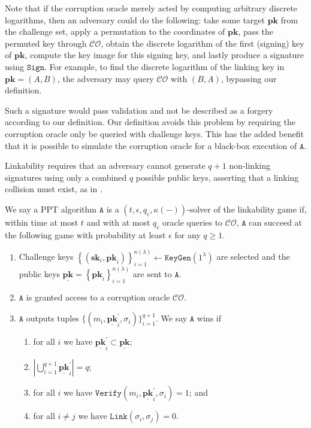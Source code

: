 \documentclass[draft]{llncs} %
\begin{document}
\begin{remark}
Note that if the corruption oracle merely acted by computing arbitrary discrete logarithms, then an adversary could do the following: take some target $\textbf{pk}$ from the challenge set, apply a permutation to the coordinates of $\textbf{pk}$, pass the permuted key through $\mathcal{CO}$, obtain the discrete logarithm of the first (signing) key of $\textbf{pk}$, compute the key image for this signing key, and lastly produce a signature using $\texttt{Sign}$. For example, to find the discrete logarithm of the linking key in $\textbf{pk} = (A, B)$, the adversary may query $\mathcal{CO}$ with $(B, A)$, bypassing our definition.

Such a signature would pass validation and not be described as a forgery according to our definition. Our definition avoids this problem by requiring the corruption oracle only be queried with challenge keys. This has the added benefit that it is possible to simulate the corruption oracle for a black-box execution of $\texttt{A}$.
\end{remark}

Linkability requires that an adversary cannot generate $q + 1$ non-linking signatures using only a combined $q$ possible public keys, asserting that a linking collision must exist, as in \cite{backes2019ring}.

\begin{definition}[Linkability]
We say a PPT algorithm $\texttt{A}$  is a $(t, \epsilon, q_c, \kappa(-))$-solver of the linkability game if, within time at most $t$ and with at most $q_c$ oracle queries to $\mathcal{CO}$, $\texttt{A}$ can succeed at the following game with probability at least $\epsilon$ for any $q \geq 1$.
\begin{enumerate}
\item Challenge keys $\left\{(\textbf{sk}_i, \textbf{pk}_i)\right\}_{i=1}^{\kappa(\lambda)} \leftarrow \texttt{KeyGen}(1^\lambda)$ are selected and the public keys $\underline{\textbf{pk}} = \left\{\textbf{pk}_i\right\}_{i=1}^{n(\lambda)}$ are sent to $\texttt{A}$.

\item $\texttt{A}$ is granted access to a corruption oracle $\mathcal{CO}$.

\item $\texttt{A}$ outputs tuples $\{(m_i, \underline{\textbf{pk}}_i^\prime, \sigma_i)\}_{i=1}^{q+1}$. We say $\texttt{A}$ wins if
\begin{enumerate}
\item for all $i$ we have $\underline{\textbf{pk}}_i^\prime \subset \underline{\textbf{pk}}$;
\item $\left| \bigcup_{i=1}^{q+1} \underline{\textbf{pk}}_i^\prime \right| = q$;
\item for all $i$ we have $\texttt{Verify}(m_i, \underline{\textbf{pk}}_i^\prime, \sigma_i) = 1$; and
\item for all $i \neq j$ we have $\texttt{Link}(\sigma_i,\sigma_j) = 0$.
\end{enumerate}

\end{enumerate}
\end{definition}
\end{document}

